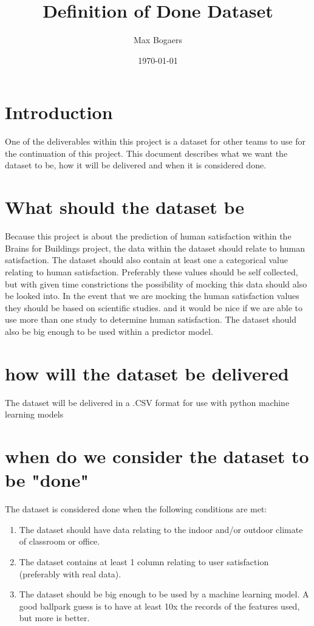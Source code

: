 \documentclass[12pt, letterpaper]{article}
\begin{document}
\title{Definition of Done Dataset}
\author{Max Bogaers}
\date{\today}


	
	\maketitle
	
	\newpage
%	
\section{Introduction}
	One of the deliverables within this project is a dataset for other teams to use for the continuation of this project. This document describes what we want the dataset to be, how it will be delivered and when it is considered done. 
	
	
\section{What should the dataset be}
	Because this project is about the prediction of human satisfaction within the Brains for Buildings project, the data within the dataset should relate to human satisfaction. The dataset should also contain at least one a categorical value relating to human satisfaction. Preferably these values should be self collected, but with given time constrictions the possibility of mocking this data should also be looked into. In the event that we are mocking the human satisfaction values they should be based on scientific studies. and it would be nice if we are able to use more than one study to determine human satisfaction. The dataset should also be big enough to be used within a predictor model. 
\section{how will the dataset be delivered}
	The dataset will be delivered in a .CSV format for use with python machine learning models 
\section{when do we consider the dataset to be "done"}
	The dataset is considered done when the following conditions are met:
		\begin{enumerate}
			\item The dataset should have data relating to the indoor and/or outdoor climate of classroom or office. 
			\item The dataset contains at least 1 column relating to user satisfaction (preferably with real data).
			\item The dataset should be big enough to be used by a machine learning model. A good ballpark guess is to have at least 10x the records of the features used, but more is better. 
		\end{enumerate}
\end{document}
